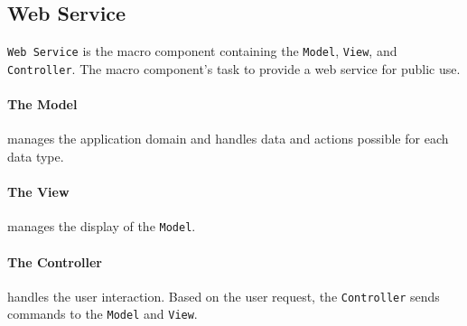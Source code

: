 \subsection*{Web Service}\texttt{Web Service} is the macro component containing the \texttt{Model}, \texttt{View}, and \texttt{Controller}.
The macro component's task to provide a web service for public use.

\paragraph{The Model} manages the application domain and handles data and actions possible for each data type.

\paragraph{The View} manages the display of the \texttt{Model}.

\paragraph{The Controller} handles the user interaction. Based on the user request, the \texttt{Controller} sends commands to the \texttt{Model} and \texttt{View}.